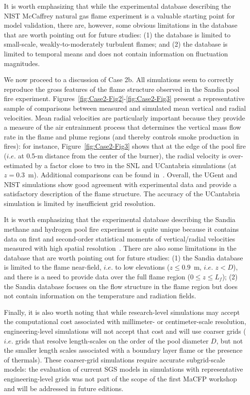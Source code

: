 It is worth emphasizing that while the experimental database describing the NIST McCaffrey natural gas flame experiment is a valuable starting point for model validation, there are, however, some obvious limitations in the database that are worth pointing out for future studies: (1) the database is limited to small-scale, weakly-to-moderately turbulent flames; and (2) the database is limited to temporal means and does not contain information on fluctuation magnitudes.

We now proceed to a discussion of Case 2b. All simulations seem to correctly reproduce the gross features of the flame structure observed in the Sandia pool fire experiment. Figures~\ref{fig:Case2-Fig2}-\ref{fig:Case2-Fig3} present a representative sample of comparisons between measured and simulated mean vertical and radial velocities. Mean radial velocities are particularly important because they provide a measure of the air entrainment process that determines the vertical mass flow rate in the flame and plume regions (and thereby controls smoke production in fires): for instance, Figure~\ref{fig:Case2-Fig3} shows that at the edge of the pool fire ($i.e.$ at 0.5-m distance from the center of the burner), the radial velocity is over-estimated by a factor close to two in the SNL and UCantabria simulations (at $z = 0.3$~m). Additional comparisons can be found in~\cite{MaCFP_wks_presentations}. Overall, the UGent and NIST simulations show good agreement with experimental data and provide a satisfactory description of the flame structure. The accuracy of the UCantabria simulation is limited by insufficient grid resolution. 

It is worth emphasizing that the experimental database describing the Sandia methane and hydrogen pool fire experiment is quite unique because it contains data on first and second-order statistical moments of vertical/radial velocities measured with high spatial resolution~\cite{Case2b_EXP_CH4,Case2b_EXP_H2}. There are also some limitations in the database that are worth pointing out for future studies: (1) the Sandia database is limited to the flame near-field, $i.e.$ to low elevations ($z \leq 0.9$~m, $i.e.$ $z < D$), and there is a need to provide data over the full flame region ($0 \leq z \leq L_f$); (2) the Sandia database focuses on the flow structure in the flame region but does not contain information on the temperature and radiation fields.

Finally, it is also worth noting that while research-level simulations may accept the computational cost associated with millimeter- or centimeter-scale resolution, engineering-level simulations will not accept that cost and will use coarser grids ($i.e.$ grids that resolve length-scales on the order of the pool diameter $D$, but not the smaller length scales associated with a boundary layer flame or the presence of thermals). These coarser-grid simulations require accurate subgrid-scale models: the evaluation of current SGS models in simulations with representative engineering-level grids was not part of the scope of the first MaCFP workshop and will be addressed in future editions.


